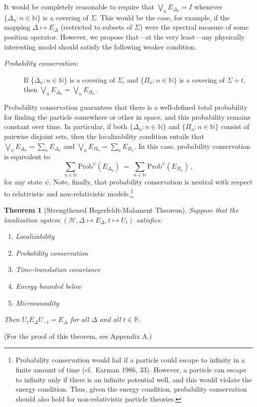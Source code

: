 \documentclass[11pt]{article}
\newtheorem{thm}{Theorem}
\theoremstyle{remark}
\newcommand{\hil}[1]{\mathcal{#1}}
\begin{document}
It would be completely reasonable to require that $\bigvee
_{n}E_{\Delta _{n}}=I$ whenever $\{ \Delta _{n}:n\in \mathbb{N}\}$ is
a covering of $\Sigma$.  This would be the case, for example, if the
mapping $\Delta \mapsto E_{\Delta}$ (restricted to subsets of
$\Sigma$) were the spectral measure of some position operator.
However, we propose that---at the very least---any physically
interesting model should satisfy the following weaker condition.
\begin{description}
\item[{\it Probability conservation:}] If $\{ \Delta _{n}:n\in
  \mathbb{N}\}$ is a covering of $\Sigma$, and $\{ \Pi _{n}:n\in
  \mathbb{N}\}$ is a covering of $\Sigma +t$, then $\bigvee
  _{n}E_{\Delta_{n}}=\bigvee _{n} E_{\Pi _{n}}$.  \end{description}
Probability conservation guarantees that there is a well-defined total
probability for finding the particle somewhere or other in space, and
this probability remains constant over time.  In particular, if both
$\{ \Delta _{n}:n\in \mathbb{N} \}$ and $\{ \Pi _{n}:n\in
\mathbb{N}\}$ consist of pairwise disjoint sets, then the
localizability condition entails that $\bigvee _{n}E_{\Delta
  _{n}}=\sum _{n}E_{\Delta _{n}}$ and $\bigvee _{n}E_{\Pi _{n}}=\sum
_{n}E_{\Pi _{n}}$.  In this case, probability conservation is
equivalent to
\begin{equation} \sum _{n\in \mathbb{N}}\mathrm{Prob} ^{\psi}(E_{\Delta
 _{n}})\:=\:\sum _{n\in \mathbb{N}}\mathrm{Prob}^{\psi}(E_{\Pi _{n}}) \,,\end{equation} 
for any state $\psi$.  Note, finally, that probability conservation is neutral with respect to 
relativistic and non-relativistic models.\footnote{Probability
  conservation would fail if a particle could escape to infinity in a 
finite amount of time (cf.~Earman
  1986, 33).  However, a particle can escape to infinity
only if there is an infinite potential well, and this would violate the energy 
condition.  Thus, given the energy condition, 
probability conservation should also hold for
non-relativistic particle theories.}   

\begin{thm}[Strengthened Hegerfeldt-Malament Theorem]  Suppose that
  the localization system $(\hil{H}, \Delta \mapsto
  E_{\Delta},t\mapsto U_{t})$ satisfies:
  \begin{enumerate}
  \item Localizability \label{ortho}
\item Probability conservation \label{conservation}
\item Time-translation covariance \label{covariance}
\item Energy bounded below \label{energy}
  \item Microcausality \label{micro}
\end{enumerate} Then $U_{t}E_{\Delta}U_{-t}=E_{\Delta}$ for all
$\Delta$ and all $t\in \mathbb{R}$.  \label{improve} \end{thm}
\noindent (For the proof of this theorem, see Appendix A.)  
\end{document}
